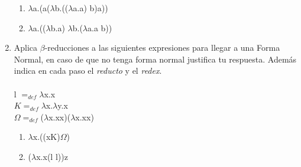 \documentclass[11pt]{article}
\begin{document}
\begin{enumerate}[leftmargin=0.8cm]
\begin{enumerate}
        \item $\lambda$a.(a($\lambda$b.(($\lambda$a.a) b)a))
        \item $\lambda$a.(($\lambda$b.a) $\lambda$b.($\lambda$a.a b))
    \end{enumerate}
    \item Aplica $\beta$-reducciones a las siguientes expresiones para llegar a una Forma Normal, en caso de que no tenga forma normal justifica tu respuesta. Además indica en cada paso el \textit{reducto} y el \textit{redex}.\\
    \\l $= _{def}\lambda$x.x\\
    $K = _{def}\lambda$x.$\lambda$y.x\\
    $\Omega = _{def}$($\lambda$x.xx)($\lambda$x.xx)
    \begin{enumerate}
        \item $\lambda$x.((xK)$\Omega$)
        \item ($\lambda$x.x(l l))z
    \end{enumerate}
\end{enumerate}
\end{document}
